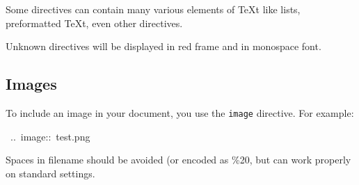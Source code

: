 \documentclass[12pt]{article}
\begin{document}
Some directives can contain many various elements of \TeX{}t like lists,
preformatted \TeX{}t, even other directives.

Unknown directives will be displayed in red frame and in monospace font.

\hypertarget{limages}{}
\subsection{Images}

To include an image in your document, you use the \texttt{image} directive.
For example:

\begin{ttfamily}\begin{flushleft}
\mbox{~..~image::~test.png}\\
\end{flushleft}\end{ttfamily}

Spaces in filename should be avoided (or encoded as \%20, but can work properly
on standard settings.
\end{document}
